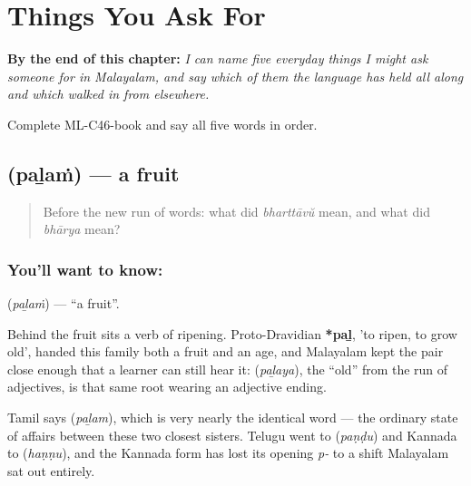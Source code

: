 
\chapter{Things You Ask For}
\label{ch:ml-ask-for}

\begin{chapteropening}
\textbf{By the end of this chapter:} \emph{I can name five everyday things I might ask someone for in Malayalam, and say which of them the language has held all along and which walked in from elsewhere.}

Complete ML-C46-book and say all five words in order.
\end{chapteropening}

\section[\texorpdfstring{\ml{പഴം} (paḻaṁ)}{പഴം (paḻaṁ)}]{ (paḻaṁ) — a fruit}

\label{lesson:ML-C46-fruit}



\begin{quote}
Before the new run of words: what did \emph{bharttāvŭ} mean, and what did \emph{bhārya} mean?
\end{quote}

\subsection*{You'll want to know: }
\textbf{} (\emph{paḻaṁ}) — \textquotedblleft{}a fruit\textquotedblright{}.

Behind the fruit sits a verb of ripening. Proto-Dravidian \textbf{*paḻ}, 'to ripen, to grow old', handed this family both a fruit and an age, and Malayalam kept the pair close enough that a learner can still hear it:  (\emph{paḻaya}), the \textquotedblleft{}old\textquotedblright{} from the run of adjectives, is that same root wearing an adjective ending.

Tamil says  (\emph{paḻam}), which is very nearly the identical word — the ordinary state of affairs between these two closest sisters. Telugu went to  (\emph{paṇḍu}) and Kannada to  (\emph{haṇṇu}), and the Kannada form has lost its opening \emph{p-} to a shift Malayalam sat out entirely.

